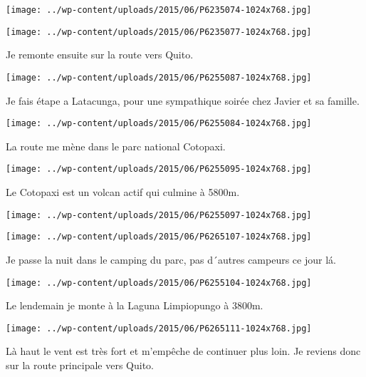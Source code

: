  \newline
\centerline{\texttt{[image: ../wp-content/uploads/2015/06/P6235074-1024x768.jpg]} } 
 \newline
 \newline
\centerline{\texttt{[image: ../wp-content/uploads/2015/06/P6235077-1024x768.jpg]} } 
 \newline
 Je remonte ensuite sur la route vers Quito. \newline
 \newline
\centerline{\texttt{[image: ../wp-content/uploads/2015/06/P6255087-1024x768.jpg]} } 
 \newline
 Je fais étape a Latacunga, pour une sympathique soirée chez Javier et sa famille. \newline
 \newline
\centerline{\texttt{[image: ../wp-content/uploads/2015/06/P6255084-1024x768.jpg]} } 
 \newline
 La route me mène dans le parc national Cotopaxi. \newline
 \newline
\centerline{\texttt{[image: ../wp-content/uploads/2015/06/P6255095-1024x768.jpg]} } 
 \newline
 Le Cotopaxi est un volcan actif qui culmine à 5800m. \newline
 \newline
\centerline{\texttt{[image: ../wp-content/uploads/2015/06/P6255097-1024x768.jpg]} } 
 \newline
 \newline
\centerline{\texttt{[image: ../wp-content/uploads/2015/06/P6265107-1024x768.jpg]} } 
 \newline
 Je passe la nuit dans le camping du parc, pas d´autres campeurs ce jour lá. \newline
 \newline
\centerline{\texttt{[image: ../wp-content/uploads/2015/06/P6255104-1024x768.jpg]} } 
 \newline
 Le lendemain je monte à la Laguna Limpiopungo à 3800m. \newline
 \newline
\centerline{\texttt{[image: ../wp-content/uploads/2015/06/P6265111-1024x768.jpg]} } 
 \newline
 Là haut le vent est très fort et m'empêche de continuer plus loin. \newline
 Je reviens donc sur la route principale vers Quito. \newline
